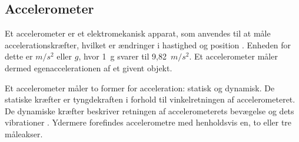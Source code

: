 \subsection{Accelerometer}
Et accelerometer er et elektromekanisk apparat, som anvendes til at måle accelerationskræfter, hvilket er ændringer i hastighed og position \citep{Goodrich2013,TittertonWeston2004}. Enheden for dette er $m/s^2$ eller $g$, hvor 1~g svarer til 9,82~$m/s^2$. Et accelerometer måler dermed egenaccelerationen af et givent objekt.~\citep{Sparkfun,TittertonWeston2004}

Et accelerometer måler to former for acceleration: statisk og dynamisk. De statiske kræfter er tyngdekraften i forhold til vinkelretningen af accelerometeret. De dynamiske kræfter beskriver retningen af accelerometerets bevægelse og dets vibrationer \citep{Sparkfun,Goodrich2013,Engineering}. Ydermere forefindes accelerometre med henholdsvis en, to eller tre måleakser. \citep{TittertonWeston2004} 

